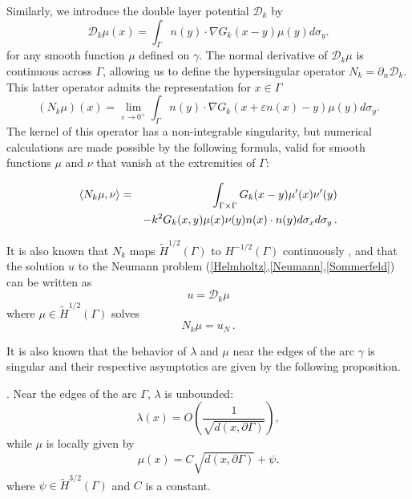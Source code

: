 \documentclass[a4paper]{article}
\begin{document}
Similarly, we introduce the double layer potential $\mathcal{D}_k$ by 
\[\mathcal{D}_k \mu(x) = \int_{\Gamma} n(y) \cdot \nabla G_k(x-y) \mu(y) d\sigma_y.\]
for any smooth function $\mu$ defined on $\gamma$.
The normal derivative of $\mathcal{D}_k\mu$ is continuous across $\Gamma$, allowing us to define the hypersingular operator $N_k = \partial_n \mathcal{D}_k$. 
This latter operator admits the representation for $x\in \Gamma$
\begin{equation}
	(N_k \mu) (x) = \lim_{\varepsilon \to 0^+} \int_{\Gamma} n(y) \cdot \nabla G_k(x + \varepsilon n(x) - y) \mu(y) d\sigma_y.
	\label{defNk}
\end{equation}
The kernel of this operator has a non-integrable singularity, but numerical calculations are made possible by the following formula, valid for smooth functions 
$\mu$ and $\nu$ that vanish at the extremities of $\Gamma$: 


\begin{eqnarray}
\label{NkenfonctiondeSk}
\left\langle N_k \mu,\nu\right\rangle &=& \int_{\Gamma\times \Gamma} G_k(x-y) \mu'(x) \nu'(y) \nonumber\\
&& - k^2 G_k(x,y) \mu(x) \nu(y) n(x) \cdot n(y) d\sigma_x d\sigma_y\,.
\end{eqnarray}


It is also known that $N_k$ maps $\tilde{H}^{1/2}(\Gamma)$ to $H^{-1/2}(\Gamma)$ continuously \cite[Theorem 1.4]{wendland1990hypersingular}, and that the solution $u$ to the Neumann 
problem (\ref{Helmholtz},\ref{Neumann},\ref{Sommerfeld}) can be written as
\begin{equation}
	u = \mathcal{D}_k \mu
\end{equation}
where $\mu \in \tilde{H}^{1/2}(\Gamma)$ solves
\begin{equation}
	N_k \mu = u_N\,.
	\label{Nkmu}
\end{equation}  

It is also known that the behavior of $\lambda$ and $\mu$ near the edges of the arc $\gamma$ is singular and their 
respective asymptotics are given by the following proposition.
 
\begin{proposition}
\cite{stephan1984augmented,wendland1990hypersingular,monch1996numerical}.
Near the edges of the arc $\Gamma$, $\lambda$ is unbounded:
	\[\lambda(x) = O\left(\frac{1}{\sqrt{d(x,\partial \Gamma)}}\right),\]
while $\mu$ is locally given by
	\[\mu(x) = C\sqrt{d(x,\partial \Gamma)} + \psi.\]
	where $\psi \in \tilde{H}^{3/2}(\Gamma)$ and $C$ is a constant.
\end{proposition}
\end{document}
